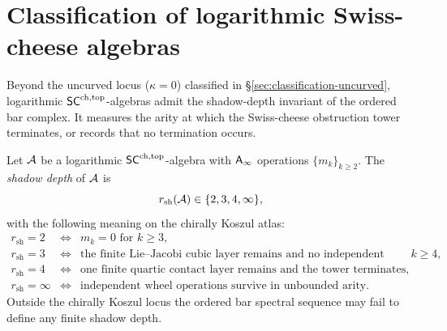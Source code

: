 \section{Classification of logarithmic Swiss-cheese algebras}
\label{sec:classification-sc-algebras}

\providecommand{\dalg}{r_{\mathrm{sh}}}

Beyond the uncurved locus ($\kappa = 0$) classified in
\S\ref{sec:classification-uncurved},
logarithmic $\mathsf{SC}^{\mathrm{ch,top}}$-algebras admit the shadow-depth invariant
of the ordered bar complex. It measures the arity at which the
Swiss-cheese obstruction tower terminates, or records that no
termination occurs.

\begin{definition}
\label{def:shadow-depth}
Let $\mathcal{A}$ be a logarithmic $\mathsf{SC}^{\mathrm{ch,top}}$-algebra with
$\mathsf{A}_{\infty}$ operations $\{m_k\}_{k \ge 2}$. The \emph{shadow depth}
of $\mathcal{A}$ is
\[
\dalg(\cA)\in \{2,3,4,\infty\},
\]
with the following meaning on the chirally Koszul atlas:
\[
\begin{array}{ccl}
\dalg=2 &\Longleftrightarrow& m_k=0 \text{ for } k\ge3,\\
\dalg=3 &\Longleftrightarrow& \text{the finite Lie--Jacobi cubic
 layer remains and no independent wheel or contact term survives for }k\ge4,\\
\dalg=4 &\Longleftrightarrow& \text{one finite quartic contact
 layer remains and the tower terminates,}\\
\dalg=\infty &\Longleftrightarrow& \text{independent wheel
 operations survive in unbounded arity.}
\end{array}
\]
Outside the chirally Koszul locus the ordered bar spectral sequence
may fail to define any finite shadow depth.
\end{definition}

